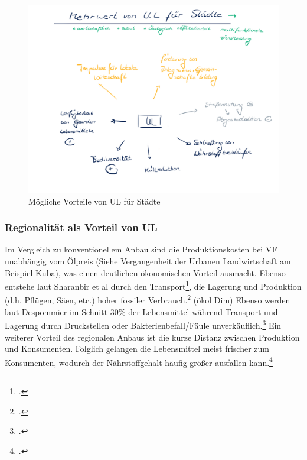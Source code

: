 \documentclass{scrartcl}
\begin{document}
\begin{figure}[htbp]
\centering
\includegraphics[width=14cm]{image_folder/moeglicheVorteileUL.png}
\caption{Mögliche Vorteile von UL für Städte}
\label{fig:MoeglicheVorteilevonUL}
\end{figure}

\subsubsection{Regionalität als Vorteil von UL}

Im Vergleich zu konventionellem Anbau sind die Produktionskosten bei VF unabhängig vom Ölpreis (Siehe {Vergangenheit der Urbanen Landwirtschaft} am Beispiel Kuba), was einen deutlichen ökonomischen Vorteil ausmacht.
Ebenso entstehe laut Sharanbir et al durch den Transport\footcite[Vgl.][]{GrewalCanFood}, die Lagerung und Produktion (d.h. Pflügen, Säen, etc.) hoher fossiler Verbrauch.\footcite[]{2012TheEssay} (ökol Dim) 
Ebenso werden laut Despommier im Schnitt 30\% der Lebensmittel während Transport und Lagerung durch Druckstellen oder Bakterienbefall/Fäule unverkäuflich.\footcite{Despommier2009TheFarms}
Ein weiterer Vorteil des regionalen Anbaus ist die kurze Distanz zwischen Produktion und Konsumenten. Folglich gelangen die Lebensmittel meist frischer zum Konsumenten, wodurch der Nährstoffgehalt häufig größer ausfallen kann.\footcite{Despommier2009TheFarms}


     
\end{document}
